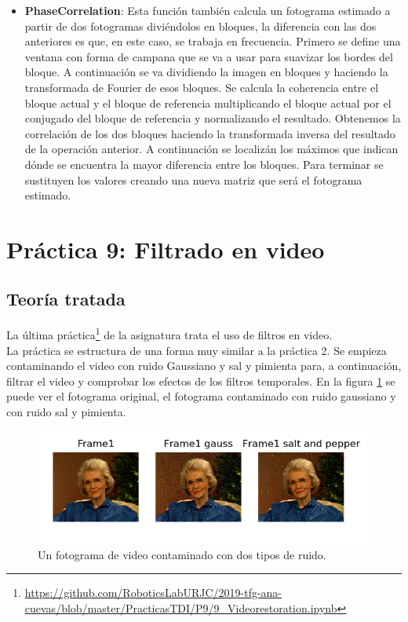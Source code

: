\begin{itemize}
	\item \textbf{PhaseCorrelation}: Esta función también calcula un fotograma estimado a partir de dos fotogramas diviéndolos en bloques, la diferencia con las dos anteriores es que, en este caso, se trabaja en frecuencia. Primero se define una ventana con forma de campana que se va a usar para suavizar los bordes del bloque. A continuación se va dividiendo la imagen en bloques y haciendo la transformada de Fourier de esos bloques.  Se calcula la coherencia entre el bloque actual y el bloque de referencia multiplicando el bloque actual por el conjugado del bloque de referencia y normalizando el resultado. Obtenemos la correlación de los dos bloques haciendo la transformada inversa del resultado de la operación anterior. A continuación se localizán los máximos que indican dónde se encuentra la mayor diferencia entre los bloques. Para terminar se sustituyen los valores creando una nueva matriz que será el fotograma estimado.
\end{itemize}

\section{ Práctica 9: Filtrado en video}
\subsection{Teoría tratada}

La última práctica\footnote{\url{https://github.com/RoboticsLabURJC/2019-tfg-ana-cuevas/blob/master/PracticasTDI/P9/9_Videorestoration.ipynb}} de la asignatura trata el uso de filtros en video.\\

La práctica se estructura de una forma muy similar a la práctica 2. Se empieza contaminando el video con ruido Gaussiano y sal y pimienta para, a continuación, filtrar el video y comprobar los efectos de los filtros temporales. En la figura \ref{ruidovideo} se puede ver el fotograma original, el fotograma contaminado con ruido gaussiano y con ruido sal y pimienta.\\
\begin{figure}[h]
\centering
\includegraphics[width=1.0\textwidth]{imagenes/ruidovideo}
\caption{Un fotograma de video contaminado con dos tipos de ruido.}
\label{ruidovideo} 
\end{figure}

